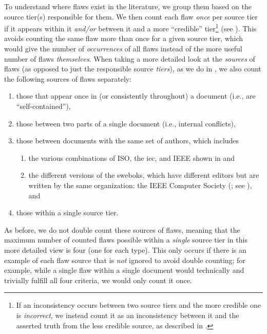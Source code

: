 \label{flaw-cred-compare}
To understand where flaws exist in the literature, we group them based on the
source tier(s) responsible for them. We then count each flaw \emph{once} per
source tier if it appears within it \emph{and/or} between it and a more
``credible'' tier\footnote{If an inconsistency occurs between two source tiers
    and the more credible one is \emph{incorrect}, we instead count it as an
    inconsistency between it and the asserted truth from the less credible
    source, as described in .} (see ).
This avoids counting the same flaw
more than once for a given source tier, which would give the
number of \emph{occurrences} of all flaws instead of the more useful number of
flaws \emph{themselves}. When taking a more detailed look at the \emph{sources}
of flaws (as opposed to just the responsible source \emph{tiers}), as we do in
, we also count the following sources of flaws separately:
\begin{enumerate}
    \item those that appear once in (or consistently throughout) a document
          (i.e., are ``self-contained''),
    \item those between two parts of a single document
          (i.e., internal conflicts),
    \item those between documents with the same set of authors, which includes
          \begin{enumerate}
              \item the various combinations of ISO, the \acf{iec}, and IEEE
                    shown in  and
              \item the different versions of the \acfp{swebok}, which have
                    different editors \citep{SWEBOK2024,SWEBOK2014} but are
                    written by the same organization: the IEEE Computer Society
                    (\citealp{AboutSWEBOK}; see ), and
          \end{enumerate}
    \item those within a single source tier.
\end{enumerate}
As before, we do not double count these sources of flaws, meaning that the
maximum number of counted flaws possible within a \emph{single} source tier in
this more detailed view is four (one for each type). This only occurs if there
is an example of each flaw source that is \emph{not} ignored to avoid double
counting; for example, while a single flaw within a single document would
technically and trivially fulfill all four criteria, we would only count it
once.


